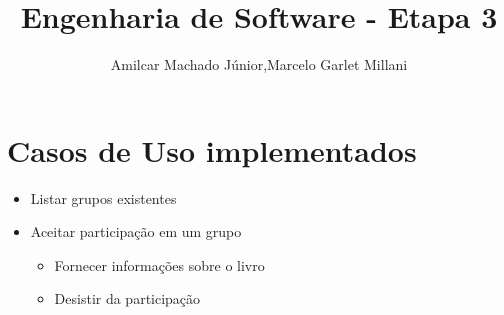 \documentclass[a4paper,10pt]{article}
\title{Engenharia de Software - Etapa 3}
\author{Amilcar Machado Júnior,Marcelo Garlet Millani}
\begin{document}
\maketitle


\section{Casos de Uso implementados}

\begin{itemize}
 \item Listar grupos existentes
 \item Aceitar participação em um grupo
	\begin{itemize}
	 \item Fornecer informações sobre o livro
 \item Desistir da participação
	\end{itemize}

\end{itemize}
\end{document}
